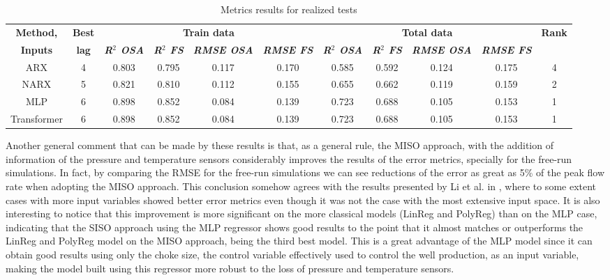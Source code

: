 \documentclass[conference]{IEEEtran}
\begin{document}
\begin{table}[htbp]
\caption{Metrics results for realized tests}
\begin{center}
\begin{tabular}{|c|c|c|c|c|c|c|c|c|c|c|}
\hline
\textbf{Method,}&\textbf{Best}&\multicolumn{4}{|c|}{\textbf{Train data}}&\multicolumn{4}{|c|}{\textbf{Total data}}&\textbf{Rank} \\
\cline{3-10} 
\textbf{Inputs} & \textbf{lag} & \textbf{\textit{R$^{\mathrm{2}}$ OSA}}& \textbf{\textit{R$^{\mathrm{2}}$ FS}}& \textbf{\textit{RMSE OSA}}& \textbf{\textit{RMSE FS}}& \textbf{\textit{R$^{\mathrm{2}}$ OSA}}& \textbf{\textit{R$^{\mathrm{2}}$ FS}} & \textbf{\textit{RMSE OSA}}& \textbf{\textit{RMSE FS}}& \\
\hline
\hline
ARX          &  4 & 0.803 & 0.795 & 0.117 & 0.170 & 0.585 & 0.592 & 0.124 & 0.175&4\\
\hline
NARX         &  5 & 0.821 & 0.810 & 0.112 & 0.155 & 0.655 & 0.662 & 0.119 & 0.159&2\\
\hline
MLP          &  6 & 0.898 & 0.852 & 0.084 & 0.139 & 0.723 & 0.688 & 0.105 & 0.153&1\\
\hline
Transformer  &  6 & 0.898 & 0.852 & 0.084 & 0.139 & 0.723 & 0.688 & 0.105 & 0.153&1\\
\hline
\end{tabular}
\label{main_results}
\end{center}
\end{table}

Another general comment that can be made by these results is that, as a general rule, the MISO approach, with the addition of information of the pressure and temperature sensors considerably improves the results of the error metrics, specially for the free-run simulations. In fact, by comparing the RMSE for the free-run simulations we can see reductions of the error as great as 5\% of the peak flow rate when adopting the MISO approach. This conclusion somehow agrees with the results presented by Li et al. in \cite{Li2019}, where to some extent cases with more input variables showed better error metrics even though it was not the case with the most extensive input space. It is also interesting to notice that this improvement is more significant on the more classical models (LinReg and PolyReg) than on the MLP case, indicating that the SISO approach using the MLP regressor shows good results to the point that it almost matches or outperforms the LinReg and PolyReg model on the MISO approach, being the third best model. This is a great advantage of the MLP model since it can obtain good results using only the choke size, the control variable effectively used to control the well production, as an input variable, making the model built using this regressor more robust to the loss of pressure and temperature sensors.
\end{document}
